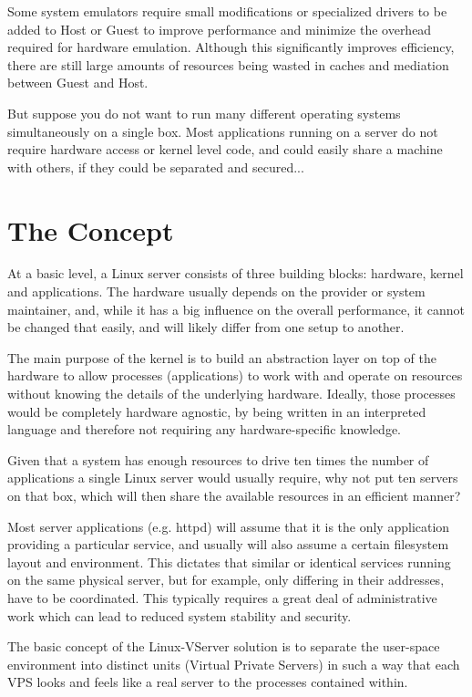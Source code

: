 Some system emulators require small modifications or specialized drivers to be
added to Host or Guest to improve performance and minimize the overhead
required for hardware emulation. Although this significantly improves
efficiency, there are still large amounts of resources being wasted in caches
and mediation between Guest and Host.

But suppose you do not want to run many different operating systems
simultaneously on a single box. Most applications running on a server do not
require hardware access or kernel level code, and could easily share a machine
with others, if they could be separated and secured...


\section{The Concept}

At a basic level, a Linux server consists of three building blocks: hardware,
kernel and applications. The hardware usually depends on the provider or system
maintainer, and, while it has a big influence on the overall performance, it
cannot be changed that easily, and will likely differ from one setup to
another.

The main purpose of the kernel is to build an abstraction layer on top of the
hardware to allow processes (applications) to work with and operate on
resources without knowing the details of the underlying hardware. Ideally,
those processes would be completely hardware agnostic, by being written in an
interpreted language and therefore not requiring any hardware-specific
knowledge.

Given that a system has enough resources to drive ten times the number of
applications a single Linux server would usually require, why not put ten
servers on that box, which will then share the available resources in an
efficient manner?

Most server applications (e.g. httpd) will assume that it is the only
application providing a particular service, and usually will also assume a
certain filesystem layout and environment. This dictates that similar or
identical services running on the same physical server, but for example, only
differing in their addresses, have to be coordinated. This typically requires a
great deal of administrative work which can lead to reduced system stability
and security.

The basic concept of the Linux-VServer solution is to separate the user-space
environment into distinct units (Virtual Private Servers) in such a way that
each VPS looks and feels like a real server to the processes contained within.

